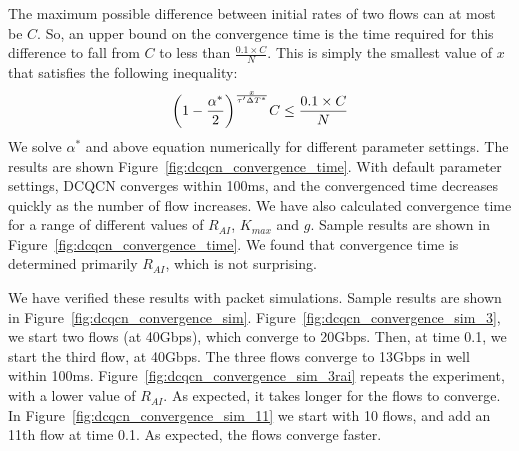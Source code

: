 The maximum possible difference between initial rates of two flows can at most
be $C$. So, an upper bound on the convergence time is the time required for this
difference to fall from $C$ to less than $\frac{0.1 \times C}{N}$. This is
simply the smallest value of $x$ that satisfies the following inequality: 
\begin{equation} 
\small 
{ \left( {1 - \frac{{{\alpha ^*}}}{2}} \right)^{\frac{x}{{\tau '\Delta{T^*}}}}}C \le \frac{0.1 \times C}{N} 
\end{equation}
We solve $\alpha^*$ and above equation numerically for different parameter
settings. The results are shown Figure~\ref{fig:dcqcn_convergence_time}. With
default parameter settings, DCQCN converges within 100ms, and the convergenced
time decreases quickly as the number of flow increases.  We have also calculated
convergence time for a range of different values of $R_{AI}$, $K_{max}$ and $g$.
Sample results are shown in Figure~\ref{fig:dcqcn_convergence_time}. We found
that convergence time is determined primarily $R_{AI}$, which is not surprising.

We have verified these results with packet simulations. Sample results are shown
in Figure~\ref{fig:dcqcn_convergence_sim}.
Figure~\ref{fig:dcqcn_convergence_sim_3}, we start two flows (at 40Gbps), which
converge to 20Gbps. Then, at time 0.1, we start the third flow, at 40Gbps.  The
three flows converge to 13Gbps in well within 100ms.
Figure~\ref{fig:dcqcn_convergence_sim_3rai} repeats the experiment, with a lower
value of $R_{AI}$. As expected, it takes longer for the flows to converge. In
Figure~\ref{fig:dcqcn_convergence_sim_11} we start with 10 flows, and add an
11th flow at time 0.1. As expected, the flows converge faster.

